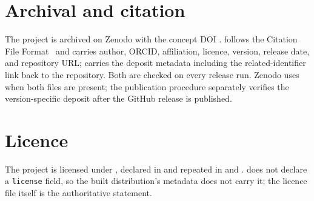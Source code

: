 \section{Archival and citation}

The project is archived on Zenodo with the concept DOI
\texttt{\projectdoi}.  follows the Citation File
Format~\cite{citationcff} and carries author, ORCID, affiliation, licence,
version, release date, and repository URL;  carries the
deposit metadata including the related-identifier link back to the repository.
Both are checked on every release run. Zenodo uses 
when both files are present; the publication procedure separately verifies the
version-specific deposit after the GitHub release is published.

\section{Licence}

The project is licensed under \projectlicense, declared in 
and repeated in  and .
 does not declare a \texttt{license} field, so the
built distribution's metadata does not carry it; the licence file itself is the
authoritative statement.
